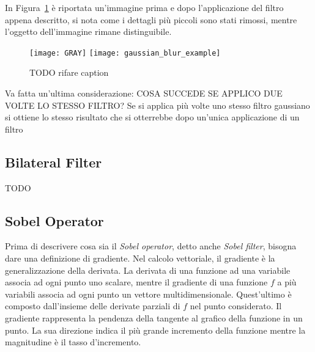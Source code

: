 
In Figura~\ref{fig:gaussian_blur_example} è riportata un'immagine prima e dopo l'applicazione del filtro appena descritto, si nota come i dettagli più piccoli sono stati rimossi, mentre l'oggetto dell'immagine rimane distinguibile.

\begin{figure}[ht] %
  \begin{center}
    \texttt{[image: GRAY]}
    \texttt{[image: gaussian\_blur\_example]}
    \label{fig:gaussian_blur_example}
    \caption{TODO rifare caption}
  \end{center}
\end{figure}

Va fatta un'ultima considerazione: COSA SUCCEDE SE APPLICO DUE VOLTE LO STESSO FILTRO?
Se si applica più volte uno stesso filtro gaussiano si ottiene lo stesso risultato che si otterrebbe dopo un'unica applicazione di un filtro 


\clearpage
\subsection {Bilateral Filter}
TODO



\clearpage
\subsection {Sobel Operator}
Prima di descrivere cosa sia il \textit{Sobel operator}, detto anche \textit{Sobel filter}, bisogna dare una definizione di gradiente.
Nel calcolo vettoriale, il gradiente è la generalizzazione della derivata.
La derivata di una funzione ad una variabile associa ad ogni punto uno scalare, mentre il gradiente di una funzione $f$ a più variabili associa ad ogni punto un vettore multidimensionale.
Quest'ultimo è composto dall'insieme delle derivate parziali di $f$ nel punto considerato.
Il gradiente rappresenta la pendenza della tangente al grafico della funzione in un punto.
La sua direzione indica il più grande incremento della funzione mentre la magnitudine è il tasso d'incremento.

